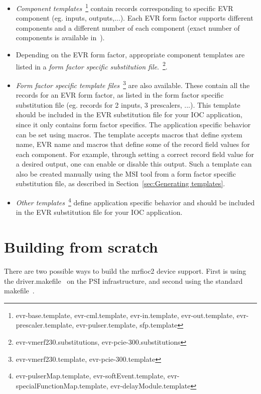 \documentclass[12pt,a4paper]{article}
\let\stdsection\section
\renewcommand\section{\newpage\stdsection}
\begin{document}
\begin{itemize}
	\item 
		\emph{Component templates}~\footnote{evr-base.template, evr-cml.template, evr-in.template, evr-out.template, evr-prescaler.template, evr-pulser.template, sfp.template} contain records corresponding to specific EVR component (eg. inputs, outputs,...). Each EVR form factor supports different components and a different number of each component (exact number of components is available in~\cite{mrm_evr}).
	\item 
		Depending on the EVR form factor, appropriate component templates are listed in a \emph{form factor specific substitution file}.~\footnote{evr-vmerf230.substitutions, evr-pcie-300.substitutions}. 
	\item 
		\emph{Form factor specific template files}~\footnote{evr-vmerf230.template, evr-pcie-300.template} are also available. These contain all the records for an EVR form factor, as listed in the form factor specific substitution file (eg. records for 2 inputs, 3 prescalers, ...). This template should be included in the EVR substitution file for your IOC application, since it only contains form factor specifics. The application specific behavior can be set using macros. The template accepts macros that define system name, EVR name and macros that define some of the record field values for each component. For example, through setting a correct record field value for a desired output, one can enable or disable this output. Such a template can also be created manually using the MSI tool from a form factor specific substitution file, as described in Section~\ref{sec:Generating templates}.
	\item 
		\emph{Other templates}~\footnote{evr-pulserMap.template, evr-softEvent.template, evr-specialFunctionMap.template, evr-delayModule.template} define application specific behavior and should be included in the EVR substitution file for your IOC application.
\end{itemize}

\section{Building from scratch}\label{sec:Building from scratch}
There are two possible ways to build the mrfioc2 device support. First is using the driver.makefile~\cite{driver.makefile} on the PSI infrastructure, and second using the standard makefile~\cite{appDevGuide}.
\end{document}
